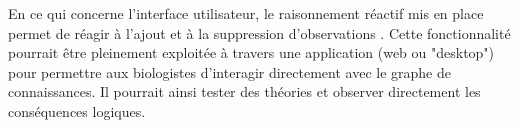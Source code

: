 \begin{refsegment}
En ce qui concerne l'interface utilisateur, le raisonnement réactif mis en place permet de réagir à l'ajout et à la suppression  d'observations . Cette fonctionnalité pourrait être pleinement exploitée à travers une application (web ou "desktop") pour permettre aux biologistes d'interagir directement avec le graphe de connaissances. Il pourrait ainsi tester des théories et observer directement les conséquences logiques.

\end{refsegment}
